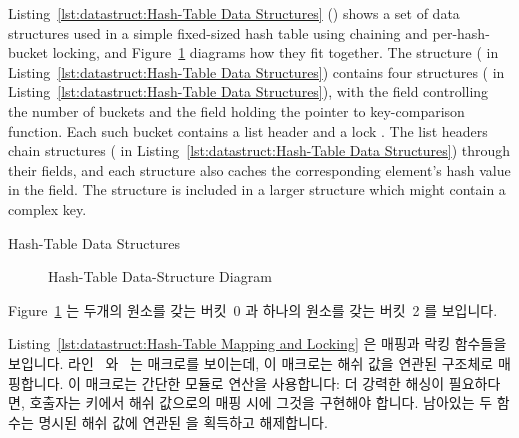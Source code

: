 \begin{fcvref}
Listing~\ref{lst:datastruct:Hash-Table Data Structures}
()
shows a set of data structures used in a simple fixed-sized hash
table using chaining and per-hash-bucket locking, and
Figure~\ref{fig:datastruct:Hash-Table Data-Structure Diagram}
diagrams how they fit together.
The  structure ( in
Listing~\ref{lst:datastruct:Hash-Table Data Structures})
contains four  structures
( in
Listing~\ref{lst:datastruct:Hash-Table Data Structures}),
with the  field controlling the number of buckets
and the  field holding the pointer to key-comparison
function.
Each such bucket contains a list header  and
a lock .
The list headers chain  structures
( in
Listing~\ref{lst:datastruct:Hash-Table Data Structures})
through their
 fields, and each  structure also caches
the corresponding element's hash value in the  field.
The  structure is included in a larger structure
which might contain a complex key.
\end{fcvref}

\fi

\begin{listing}[tb]

\caption{Hash-Table Data Structures}
\label{lst:datastruct:Hash-Table Data Structures}
\end{listing}

\begin{figure}[tb]
\centering
{}
\caption{Hash-Table Data-Structure Diagram}
\label{fig:datastruct:Hash-Table Data-Structure Diagram}
\end{figure}

Figure~\ref{fig:datastruct:Hash-Table Data-Structure Diagram}
는 두개의 원소를 갖는 버킷~0 과 하나의 원소를 갖는 버킷~2 를 보입니다.

\begin{fcvref}
Listing~\ref{lst:datastruct:Hash-Table Mapping and Locking}
은 매핑과 락킹 함수들을 보입니다.
라인~ 와~ 는  매크로를 보이는데, 이 매크로는
해쉬 값을 연관된  구조체로 매핑합니다.
이 매크로는 간단한 모듈로 연산을 사용합니다: 더 강력한 해싱이 필요하다면,
호출자는 키에서 해쉬 값으로의 매핑 시에 그것을 구현해야 합니다.
남아있는 두 함수는 명시된 해쉬 값에 연관된  을 획득하고
해제합니다.
\end{fcvref}


